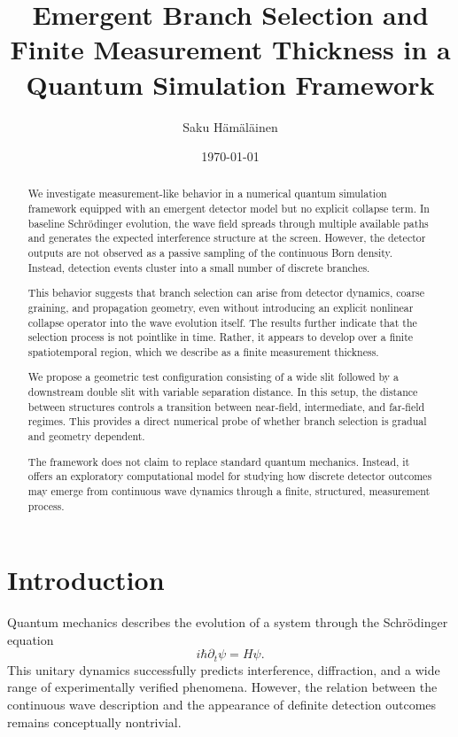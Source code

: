 \documentclass[aps,prl,reprint]{revtex4-2}
\begin{document}
\title{Emergent Branch Selection and Finite Measurement Thickness in a Quantum Simulation Framework}

\author{Saku H\"am\"al\"ainen}

\date{\today}

\begin{abstract}
We investigate measurement-like behavior in a numerical quantum simulation
framework equipped with an emergent detector model but no explicit collapse term.
In baseline Schr\"odinger evolution, the wave field spreads through multiple
available paths and generates the expected interference structure at the screen.
However, the detector outputs are not observed as a passive sampling of the
continuous Born density. Instead, detection events cluster into a small number
of discrete branches.

This behavior suggests that branch selection can arise from detector dynamics,
coarse graining, and propagation geometry, even without introducing an explicit
nonlinear collapse operator into the wave evolution itself. The results further
indicate that the selection process is not pointlike in time. Rather, it appears
to develop over a finite spatiotemporal region, which we describe as a finite
measurement thickness.

We propose a geometric test configuration consisting of a wide slit followed by
a downstream double slit with variable separation distance. In this setup, the
distance between structures controls a transition between near-field, intermediate,
and far-field regimes. This provides a direct numerical probe of whether branch
selection is gradual and geometry dependent.

The framework does not claim to replace standard quantum mechanics. Instead, it
offers an exploratory computational model for studying how discrete detector
outcomes may emerge from continuous wave dynamics through a finite, structured,
measurement process.
\end{abstract}

\maketitle

\section{Introduction}

Quantum mechanics describes the evolution of a system through the Schr\"odinger
equation
\begin{equation}
i\hbar \partial_t \psi = H \psi.
\end{equation}
This unitary dynamics successfully predicts interference, diffraction, and a wide
range of experimentally verified phenomena. However, the relation between the
continuous wave description and the appearance of definite detection outcomes
remains conceptually nontrivial.
\end{document}

